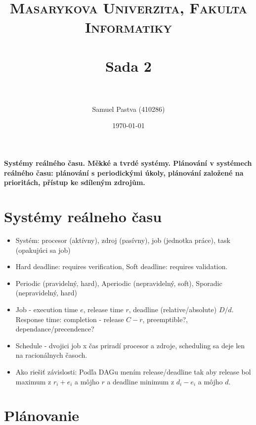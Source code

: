 \documentclass[paper=a4, fontsize=11pt]{scrartcl} %
\title{	
	\normalfont \normalsize 
	\textsc{Masarykova Univerzita, Fakulta Informatiky} \\ [25pt] %
	\horrule{0.5pt} \\[0.4cm] %
	\huge Sada 2 \\ %
	\horrule{2pt} \\[0.5cm] %
}
\author{Samuel Pastva (410286)} %
\date{\normalsize\today} %
\numberwithin{equation}{section} %
\numberwithin{figure}{section} %
\numberwithin{table}{section} %
\begin{document}
	
	\textbf{Systémy reálného času. Měkké a tvrdé systémy. Plánování v systémech reálného času: plánování s periodickými úkoly, plánování založené na prioritách, přístup ke sdíleným zdrojům.}
	
	\section{Systémy reálneho času}
	
	\begin{itemize}
		\item Systém: procesor (aktívny), zdroj (pasívny), job (jednotka práce), task (opakujúci sa job)
		
		\item Hard deadline: requires verification, Soft deadline: requires validation.
		
		\item Periodic (pravidelný, hard), Aperiodic (nepravidelný, soft), Sporadic (nepravidelný, hard)
		
		\item Job - execution time $e$, release time $r$, deadline (relative/absolute) $D/d$. Response time: completion - release $C - r$, preemptible?, dependance/precendence? 
		
		\item Schedule - dvojici job x čas priradí procesor a zdroje, scheduling sa deje len na racionálnych časoch.
		
		\item Ako riešiť závislosti: Podľa DAGu mením release/deadline tak aby release bol maximum z $r_i + e_i$ a môjho $r$ a deadline minimum z $d_i - e_i$ a môjho $d$.
		
	
	\end{itemize}

	\section{Plánovanie}
	
\end{document}
